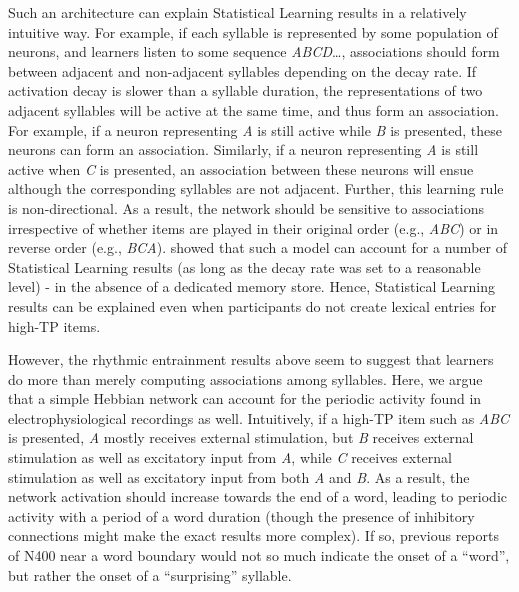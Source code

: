\documentclass[
]{article}
\begin{document}
Such an architecture can explain Statistical Learning results in a
relatively intuitive way. For example, if each syllable is represented
by some population of neurons, and learners listen to some sequence
\emph{ABCD}\ldots, associations should form between adjacent and
non-adjacent syllables depending on the decay rate. If activation decay
is slower than a syllable duration, the representations of two adjacent
syllables will be active at the same time, and thus form an association.
For example, if a neuron representing \emph{A} is still active while
\emph{B} is presented, these neurons can form an association. Similarly,
if a neuron representing \emph{A} is still active when \emph{C} is
presented, an association between these neurons will ensue although the
corresponding syllables are not adjacent. Further, this learning rule is
non-directional. As a result, the network should be sensitive to
associations irrespective of whether items are played in their original
order (e.g., \emph{ABC}) or in reverse order (e.g., \emph{BCA}).
\citep{Endress-TP-Model} showed that such a model can account for a
number of Statistical Learning results (as long as the decay rate was
set to a reasonable level) - in the absence of a dedicated memory store.
Hence, Statistical Learning results can be explained even when
participants do not create lexical entries for high-TP items.

However, the rhythmic entrainment results above seem to suggest that
learners do more than merely computing associations among syllables.
Here, we argue that a simple Hebbian network can account for the
periodic activity found in electrophysiological recordings as well.
Intuitively, if a high-TP item such as \emph{ABC} is presented, \emph{A}
mostly receives external stimulation, but \emph{B} receives external
stimulation as well as excitatory input from \emph{A}, while \emph{C}
receives external stimulation as well as excitatory input from both
\emph{A} and \emph{B}. As a result, the network activation should
increase towards the end of a word, leading to periodic activity with a
period of a word duration (though the presence of inhibitory connections
might make the exact results more complex). If so, previous reports of
N400 near a word boundary would not so much indicate the onset of a
``word'', but rather the onset of a ``surprising'' syllable.
\end{document}
